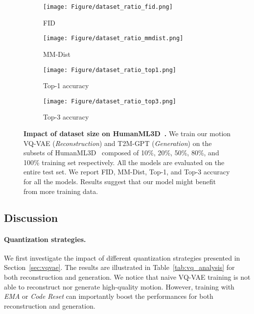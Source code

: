 \documentclass[10pt,twocolumn,letterpaper]{article}
\begin{document}
\begin{figure}[t]
 \centering
  \begin{subfigure}[b]{0.49\columnwidth}
    \texttt{[image: Figure/dataset\_ratio\_fid.png]}
    \caption{FID}
    \label{fig:fid}
  \end{subfigure}
  \hfill \begin{subfigure}[b]{0.49\columnwidth}
    \texttt{[image: Figure/dataset\_ratio\_mmdist.png]}
    \caption{MM-Dist}
    \label{fig:mmdist}
  \end{subfigure}
  \hfill \begin{subfigure}[b]{0.49\columnwidth}
    \texttt{[image: Figure/dataset\_ratio\_top1.png]}
    \caption{Top-1 accuracy}
    \label{fig:top1}
  \end{subfigure}
  \hfill \begin{subfigure}[b]{0.49\columnwidth}
    \texttt{[image: Figure/dataset\_ratio\_top3.png]}
    \caption{Top-3 accuracy}
    \label{fig:top3}
  \end{subfigure}
  \caption{\textbf{Impact of dataset size on HumanML3D~\cite{guo2022generating}.} We train our motion VQ-VAE (\textit{Reconstruction}) and  T2M-GPT (\textit{Generation}) on the subsets of HumanML3D~\cite{guo2022generating} composed of 10\%, 20\%, 50\%, 80\%, and 100\% training set respectively. All the models are evaluated on the entire test set. We report FID, MM-Dist, Top-1, and Top-3 accuracy for all the models. Results suggest that our model might benefit from more training data.}
  \label{fig:dataset}
\end{figure}




\subsection{Discussion}
\label{sec:discuss}
\paragraph{Quantization strategies.} We first investigate the impact of different quantization strategies presented in Section~\ref{sec:vqvae}. The results are illustrated in Table~\ref{tab:vq_analysis} for both reconstruction and generation. We notice that naive VQ-VAE training is not able to reconstruct nor generate high-quality motion. However, training with \textit{EMA} or \textit{Code Reset} can importantly boost the performances for both reconstruction and generation. 
\end{document}
